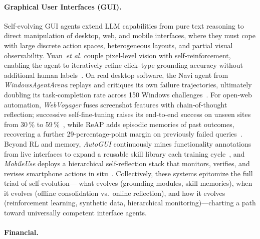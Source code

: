 \paragraph{Graphical User Interfaces (GUI).}
Self‑evolving GUI agents extend LLM capabilities from pure text reasoning to direct manipulation of desktop, web, and mobile interfaces, where they must cope with large discrete action spaces, heterogeneous layouts, and partial visual observability. Yuan~\textit{et al.} couple pixel‑level vision with self‑reinforcement, enabling the agent to iteratively refine click–type grounding accuracy without additional human labels~\citep{yuan2025enhancing}.  On real desktop software, the Navi agent from \textit{WindowsAgentArena} replays and critiques its own failure trajectories, ultimately doubling its task‑completion rate across 150 Windows challenges~\citep{bonatti2024windows}.  For open‑web automation, \textit{WebVoyager} fuses screenshot features with chain‑of‑thought reflection; successive self‑fine‑tuning raises its end‑to‑end success on unseen sites from 30\,\% to 59\,\%~\citep{he2024webvoyager}, while ReAP adds episodic memories of past outcomes, recovering a further 29‑percentage‑point margin on previously failed queries~\citep{azam2025reap}.  Beyond RL and memory, \textit{AutoGUI} continuously mines functionality annotations from live interfaces to expand a reusable skill library each training cycle~\citep{li2025autogui}, and \textit{MobileUse} deploys a hierarchical self‑reflection stack that monitors, verifies, and revises smartphone actions in situ~\citep{wu2025mobileuse}.  Collectively, these systems epitomize the full triad of self‑evolution— what evolves (grounding modules, skill memories), when it evolves (offline consolidation vs.\ online reflection), and how it evolves (reinforcement learning, synthetic data, hierarchical monitoring)—charting a path toward universally competent interface agents. 



\paragraph{Financial.}

